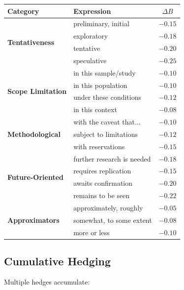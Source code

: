 \documentclass[11pt,a4paper]{article}
\theoremstyle{remark}
\begin{document}
\begin{lexiconbox}[title={Hedging Expression Modifiers ($\Delta B$)}]
\begin{center}
\begin{tabular}{llc}
\toprule
\textbf{Category} & \textbf{Expression} & \textbf{$\Delta B$} \\
\midrule
\multirow{4}{*}{\textbf{Tentativeness}}
    & preliminary, initial & $-0.15$ \\
    & exploratory & $-0.18$ \\
    & tentative & $-0.20$ \\
    & speculative & $-0.25$ \\
\midrule
\multirow{4}{*}{\textbf{Scope Limitation}}
    & in this sample/study & $-0.10$ \\
    & in this population & $-0.10$ \\
    & under these conditions & $-0.12$ \\
    & in this context & $-0.08$ \\
\midrule
\multirow{3}{*}{\textbf{Methodological}}
    & with the caveat that... & $-0.10$ \\
    & subject to limitations & $-0.12$ \\
    & with reservations & $-0.15$ \\
\midrule
\multirow{4}{*}{\textbf{Future-Oriented}}
    & further research is needed & $-0.18$ \\
    & requires replication & $-0.15$ \\
    & awaits confirmation & $-0.20$ \\
    & remains to be seen & $-0.22$ \\
\midrule
\multirow{3}{*}{\textbf{Approximators}}
    & approximately, roughly & $-0.05$ \\
    & somewhat, to some extent & $-0.08$ \\
    & more or less & $-0.10$ \\
\bottomrule
\end{tabular}
\end{center}
\end{lexiconbox}

\subsection{Cumulative Hedging}

Multiple hedges accumulate:
\end{document}

